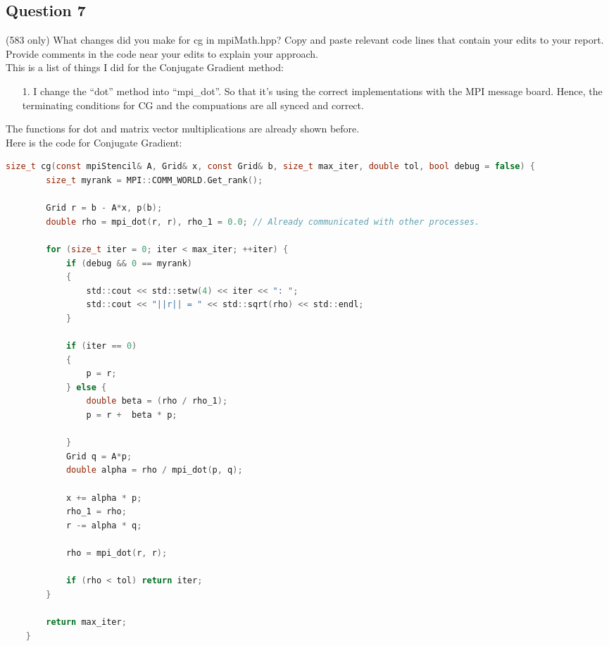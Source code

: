 \documentclass[]{article}
\begin{document}
            \subsection*{Question 7}
                (583 only) What changes did you make for cg in mpiMath.hpp? Copy and paste relevant code lines that contain your edits to your report. Provide comments in the code near your edits to explain your approach.
                \\[1.1em]
                This is a list of things I did for the Conjugate Gradient method:
                \begin{enumerate}
                    \item[1.] I change the ``dot'' method into ``mpi\_dot''. So that it's using the correct implementations with the MPI message board. Hence, the terminating conditions for CG and the compuations are all synced and correct. 
                \end{enumerate}
                The functions for dot and matrix vector multiplications are already shown before. 
                \\[1.1em]
                Here is the code for Conjugate Gradient: 
                \begin{lstlisting}[language=c]
    size_t cg(const mpiStencil& A, Grid& x, const Grid& b, size_t max_iter, double tol, bool debug = false) {
        size_t myrank = MPI::COMM_WORLD.Get_rank();

        Grid r = b - A*x, p(b);
        double rho = mpi_dot(r, r), rho_1 = 0.0; // Already communicated with other processes. 

        for (size_t iter = 0; iter < max_iter; ++iter) {
            if (debug && 0 == myrank) 
            {
                std::cout << std::setw(4) << iter << ": ";
                std::cout << "||r|| = " << std::sqrt(rho) << std::endl;
            }

            if (iter == 0) 
            {
                p = r;
            } else {
                double beta = (rho / rho_1);
                p = r +  beta * p;

            }
            Grid q = A*p;
            double alpha = rho / mpi_dot(p, q);
            
            x += alpha * p;
            rho_1 = rho;
            r -= alpha * q;
            
            rho = mpi_dot(r, r);

            if (rho < tol) return iter;
        }

        return max_iter;
    }
                \end{lstlisting}
\end{document}
